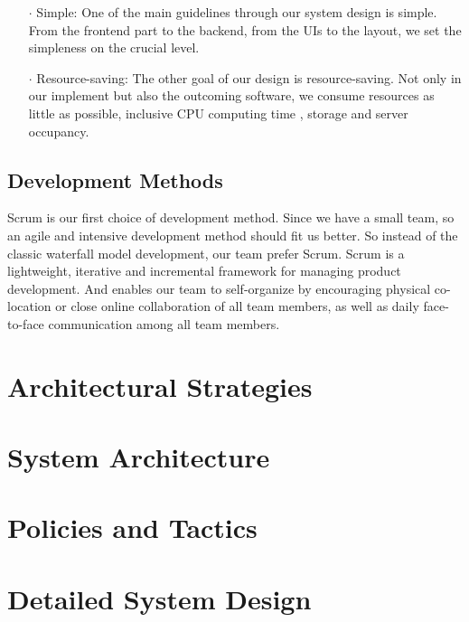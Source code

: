 \documentclass[runningheads]{llncs}
\begin{document}
\begin{itemize}
	\item[\Large $\cdot$] Simple:
	One of the main guidelines through our system design is simple. From the frontend part to the backend, from the UIs to the layout, we set the simpleness on the crucial level.\\
	\item[\Large $\cdot$] Resource-saving:
	The other goal of our design is resource-saving. Not only in our implement but also the outcoming software, we consume resources as little as possible, inclusive CPU computing time , storage and server occupancy. 
\end{itemize}

\subsection{Development Methods}

Scrum is our first choice of development method. Since we have a small team, so an agile and intensive development method should fit us better. So instead of the classic waterfall model development, our team prefer Scrum. Scrum is a lightweight, iterative and incremental framework for managing product development. And enables our team to self-organize by encouraging physical co-location or close online collaboration of all team members, as well as daily face-to-face communication among all team members.\cite{wiki:xxx}

\section{Architectural Strategies}
\section{System Architecture}
\section{Policies and Tactics}
\section{Detailed System Design}





\end{document}

